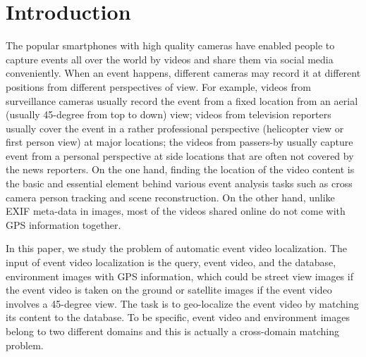\section{Introduction}
\label{sec:introduction}
The popular smartphones with high quality cameras have enabled people to capture events all over the world by videos and share them via social media conveniently.  
When an event happens, different cameras may record it at different positions from different perspectives of view.
For example, videos from surveillance cameras usually record the event from a fixed location from an aerial (usually 45-degree from top to down) view; 
videos from television reporters usually cover the event in a rather professional perspective (helicopter view or first person view) at major locations; 
the videos from passers-by usually capture event from a personal perspective at side locations that are often not covered by the news reporters.
On the one hand, finding the location of the video content is the basic and essential element behind various event analysis tasks such as cross camera person tracking and scene reconstruction. 
On the other hand, unlike EXIF meta-data in images, most of the videos shared online do not come with GPS information together. 

In this paper, we study the problem of automatic event video localization. 
The input of event video localization is the query, event video, and the database, environment images with GPS information, which could be street view images if the event video is taken on the ground or satellite images if the event video involves a 45-degree view. 
The task is to geo-localize the event video by matching its content to the database. 
To be specific, event video and environment images belong to two different domains and this is actually a cross-domain matching problem.  

